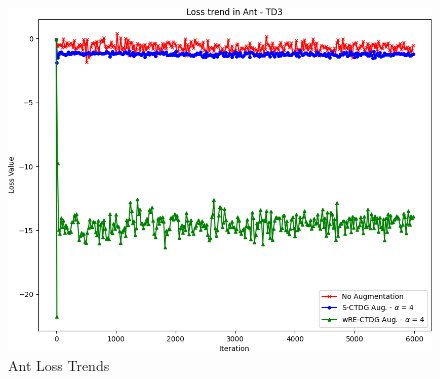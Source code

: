 \begin{figure}[h]
    \centering
    \includegraphics[width=.8\textwidth]{figures/ch5/loss_ant.png}
    \caption{Ant Loss Trends}
    \label{fig:loss_ant}
\end{figure}

